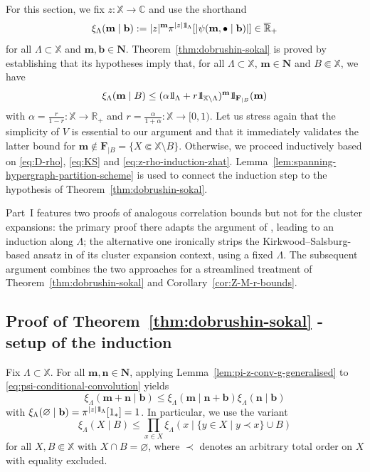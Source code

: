 \documentclass[10pt,a4paper]{amsart}
\newcommand{\R}{\mathbb{R}}
\newcommand{\C}{\mathbb{C}}
\newcommand{\X}{\mathbb X}
\newcommand{\be}{\begin{equation}}
\newcommand{\ee}{\end{equation}}
\def\1{{\mathchoice {1\mskip-4mu\mathrm l}      
{1\mskip-4mu\mathrm l}
{1\mskip-4.5mu\mathrm l} {1\mskip-5mu\mathrm l}}}
\begin{document}
For this section, we fix $z : \X \to \C$ and use the shorthand
\[
	\xi_\Lambda(\mathbf m \mid \mathbf b) : = |z|^\mathbf m \pi^{|z| \1_\Lambda}[|\psi(\mathbf m, \bullet \mid \mathbf b)|] \in \overline{\R}_+
\]
for all $\Lambda \subset \X$ and $\mathbf m, \mathbf b \in \mathbf N$. 
Theorem~\ref{thm:dobrushin-sokal} is proved by establishing that its hypotheses imply that, for all $\Lambda \subset \X$, $\mathbf m \in \mathbf N$ and $B \Subset \X$, we have
\be \label{eq:xi-leq-alpha-r-power-simple}
	\xi_\Lambda(\mathbf m \mid B) \leq (\alpha \1_\Lambda + r \1_{\X \setminus \Lambda})^\mathbf m \1_{\mathbf F_{\mid B}}(\mathbf m)
\ee
with $\alpha = \frac{r}{1-r} : \X \to \R_+$ and $r = \frac{\alpha}{1+\alpha} : \X \to [0, 1)$. 
Let us stress again that the simplicity of $V$ is essential to our argument and that it immediately validates the latter bound for $\mathbf m \notin \mathbf F_{\mid B} = \{X \Subset \X \setminus B\}$. 
Otherwise, we proceed inductively based on \eqref{eq:D-rho}, \eqref{eq:KS} and \eqref{eq:z-rho-induction-zhat}. 
Lemma~\ref{lem:spanning-hypergraph-partition-scheme} is used to connect the induction step to the hypothesis of Theorem~\ref{thm:dobrushin-sokal}.

Part~I features two proofs of analogous correlation bounds but not for the cluster expansions: 
the primary proof there adapts the argument of \cite{ref:bencs-buys}, leading to an induction along $\Lambda$; 
the alternative one ironically strips the Kirkwood--Salsburg-based ansatz in \cite{ref:jansen-kolesnikov} of its cluster expansion context, using a fixed $\Lambda$. 
The subsequent argument combines the two approaches for a streamlined treatment of Theorem~\ref{thm:dobrushin-sokal} and Corollary~\ref{cor:Z-M-r-bounds}.

\subsection{Proof of Theorem~\ref{thm:dobrushin-sokal} - setup of the induction}

Fix $\Lambda \subset \X$. 
For all $\mathbf m, \mathbf n \in \mathbf N$, applying Lemma~\ref{lem:pi-z-conv-g-generalised} to \eqref{eq:psi-conditional-convolution} yields
\[
	\xi_\Lambda(\mathbf m + \mathbf n \mid \mathbf b) \leq \xi_\Lambda(\mathbf m \mid \mathbf n + \mathbf b) \xi_\Lambda(\mathbf n \mid \mathbf b)
\]
with $\xi_\Lambda(\varnothing \mid \mathbf b) = \pi^{|z| \1_\Lambda}[1_\ast] = 1$. 
In particular, we use the variant
\be \label{eq:xi-leq-prod-xi}
	\xi_\Lambda(X \mid B) \leq \prod_{x \in X} \xi_\Lambda(x \mid \{y \in X \mid y \prec x\} \cup B)
\ee
for all $X, B \Subset \X$ with $X \cap B = \varnothing$, where $\prec$ denotes an arbitrary total order on $X$ with equality excluded.
\end{document}
